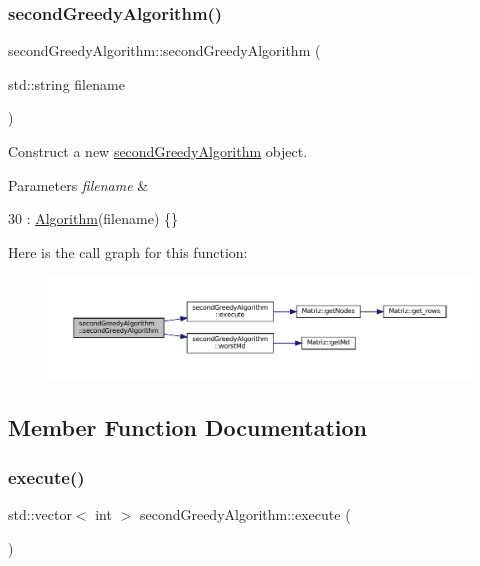 \subsubsection{\texorpdfstring{second\+Greedy\+Algorithm()}{secondGreedyAlgorithm()}}
{\footnotesize\ttfamily second\+Greedy\+Algorithm\+::second\+Greedy\+Algorithm (\begin{DoxyParamCaption}\item[{std\+::string}]{filename }\end{DoxyParamCaption})\hspace{0.3cm}{\ttfamily [inline]}}



Construct a new \hyperlink{classsecondGreedyAlgorithm}{second\+Greedy\+Algorithm} object. 


\begin{DoxyParams}{Parameters}
{\em filename} & \\
\hline
\end{DoxyParams}

\begin{DoxyCode}
30 : \hyperlink{classAlgorithm_a89df1d2c6751f70733f38daa0ee2a13b}{Algorithm}(filename) \{\}
\end{DoxyCode}
Here is the call graph for this function\+:
\nopagebreak
\begin{figure}[H]
\begin{center}
\leavevmode
\includegraphics[width=350pt]{classsecondGreedyAlgorithm_a0514ddce71b6343aaf54833c687a0fdf_cgraph}
\end{center}
\end{figure}


\subsection{Member Function Documentation}
\mbox{\label{classsecondGreedyAlgorithm_a119a730116003d00438179ccf4e2cafd}} 
\subsubsection{\texorpdfstring{execute()}{execute()}}
{\footnotesize\ttfamily std\+::vector$<$ int $>$ second\+Greedy\+Algorithm\+::execute (\begin{DoxyParamCaption}{ }\end{DoxyParamCaption})\hspace{0.3cm}{\ttfamily [virtual]}}



